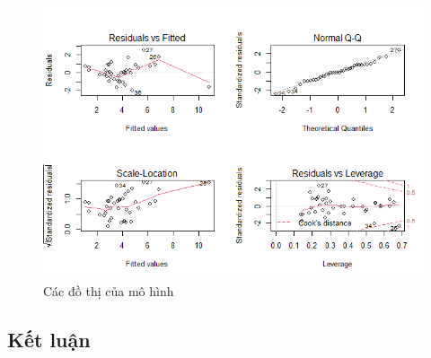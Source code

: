 \begin{figure}[H]
	\centering
	\includegraphics[width=0.7\linewidth]{images/B3/model-bic-plot}
	\caption{Các đồ thị của mô hình}
	\label{fig:model-bic-plot}
\end{figure}

\subsection*{Kết luận}
